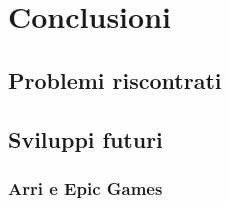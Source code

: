 \documentclass[main.tex]{subfiles}
\begin{document}
\sloppy


\vspace{1.0cm}

\section{Conclusioni}\label{sec:End}

\subsection{Problemi riscontrati}\label{subsec:6_Problems}

\subsection{Sviluppi futuri}\label{subsec:6_newDevelops}
\subsubsection{Arri e Epic Games}\label{subsec:6_1_Arri-EG}
\end{document}
